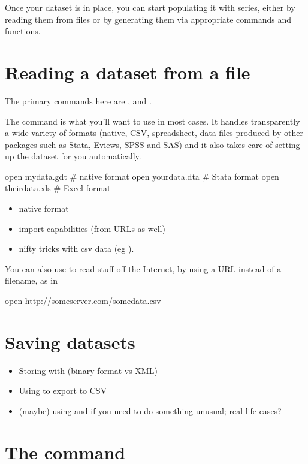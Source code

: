 Once your dataset is in place, you can start populating it with
series, either by reading them from files or by generating them via
appropriate commands and functions.

\section{Reading a dataset from a file}

The primary commands here are ,  and .

The  command is what you'll want to use in most cases. It
handles transparently a wide variety of formats (native, CSV,
spreadsheet, data files produced by other packages such as
\textsf{Stata}, \textsf{Eviews}, \textsf{SPSS} and \textsf{SAS}) and
it also takes care of setting up the dataset for you automatically.
\begin{code}
  open mydata.gdt    # native format
  open yourdata.dta  # Stata format
  open theirdata.xls # Excel format
\end{code}

\begin{itemize}
\item native format
\item import capabilities (from URLs as well)
\item nifty tricks with csv data (eg ).
\end{itemize}

You can also use  to read stuff off the Internet, by using a URL
instead of a filename, as in
\begin{code}
  open http://someserver.com/somedata.csv
\end{code}

\section{Saving datasets}

\begin{itemize}
\item Storing with  (binary format vs XML)
\item Using  to export to CSV
\item (maybe) using  and  if you need to do
  something unusual; real-life cases?
\end{itemize}

\section{The  command}

